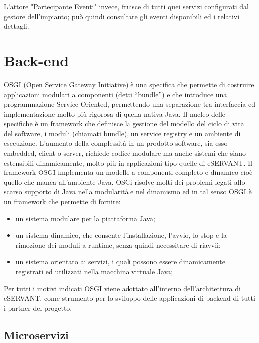 L'attore "Partecipante Eventi" invece, fruisce di tutti quei servizi configurati dal gestore dell'impianto; può quindi consultare gli eventi disponibili ed
i relativi dettagli.

\section{Back-end}
OSGI (Open Service Gateway Initiative) è una specifica che permette di costruire
applicazioni modulari a componenti (detti “bundle”) e che introduce una
programmazione Service Oriented, permettendo una separazione tra interfaccia ed
implementazione molto più rigorosa di quella nativa Java.
Il nucleo delle specifiche è un framework che definisce la gestione del modello del ciclo di vita del software, i moduli (chiamati bundle), un service registry e un ambiente di esecuzione. 
L’aumento della complessità in un prodotto software, sia esso embedded, client o server, richiede codice modulare ma anche sistemi che siano estensibili dinamicamente, molto più in applicazioni tipo quelle di eSERVANT. Il framework OSGI implementa un modello a componenti completo e dinamico cioè quello che manca all’ambiente Java. 
OSGi risolve molti dei problemi legati allo scarso supporto di Java nella modularità e nel dinamismo ed in tal senso OSGI è un framework che permette di fornire: 
\begin{itemize}
\item un sistema modulare per la piattaforma Java;
\item un sistema dinamico, che consente l’installazione, l’avvio, lo stop e la
rimozione dei moduli a runtime, senza quindi necessitare di riavvii;
\item un sistema orientato ai servizi, i quali possono essere dinamicamente
registrati ed utilizzati nella macchina virtuale Java;
\end{itemize}




Per tutti i motivi indicati OSGI viene adottato all’interno dell’architettura di eSERVANT,
come strumento per lo sviluppo delle applicazioni di backend di tutti i partner del
progetto.

\subsection{Microservizi}

